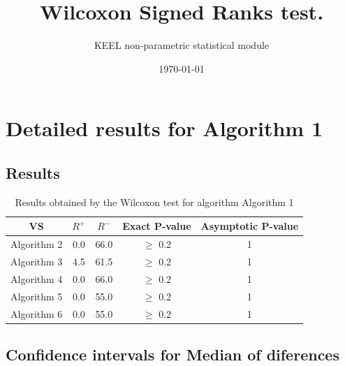 \documentclass[a4paper,10pt]{article}
\title{Wilcoxon Signed Ranks test.}
\date{\today}
\author{KEEL non-parametric statistical module}
\begin{document}
\pagestyle{empty}
\maketitle
\thispagestyle{empty}



\section{Detailed results for Algorithm 1}


\subsection{Results}

\begin{table}[!htp]
\centering\small
\begin{tabular}{
|c|c|c|c|c|}
\hline
 VS & $R^{+}$ & $R^{-}$ & Exact P-value & Asymptotic P-value \\ \hline 
Algorithm 2 & 0.0 & 66.0 & $\geq$ 0.2 & 1\\ \hline 
Algorithm 3 & 4.5 & 61.5 & $\geq$ 0.2 & 1\\ \hline 
Algorithm 4 & 0.0 & 66.0 & $\geq$ 0.2 & 1\\ \hline 
Algorithm 5 & 0.0 & 55.0 & $\geq$ 0.2 & 1\\ \hline 
Algorithm 6 & 0.0 & 55.0 & $\geq$ 0.2 & 1\\ \hline 

\end{tabular}
\caption{Results obtained by the Wilcoxon test for algorithm Algorithm 1}
\end{table}

\subsection{Confidence intervals for Median of diferences}
\end{document}
